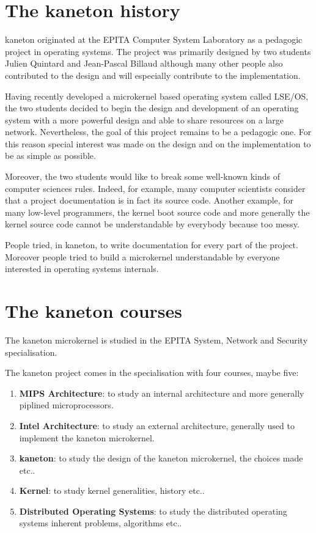 \begin{multicols}{2}

%
%

\section{The kaneton history}

kaneton originated at the EPITA Computer System Laboratory as a pedagogic
project in operating systems. The project was primarily designed by two
students Julien Quintard and Jean-Pascal Billaud although many other people
also contributed to the design and will especially contribute to the
implementation.

Having recently developed a microkernel based operating system called LSE/OS,
the two students decided to begin the design and development of an operating
system with a more powerful design and able to share resources on a large
network. Nevertheless, the goal of this project remains to be a pedagogic
one. For this reason special interest was made on the design and on the
implementation to be as simple as possible.

Moreover, the two students would like to break some well-known kinds of
computer sciences rules. Indeed, for example, many computer scientists
consider that a project documentation is in fact its source code.
Another example, for many low-level programmers, the kernel boot source code
and more generally the kernel source code cannot be understandable by
everybody because too messy.

People tried, in kaneton, to write documentation for every part of the project.
Moreover people tried to build a microkernel understandable by everyone
interested in operating systems internals.

%
%

\section{The kaneton courses}

The kaneton microkernel is studied in the EPITA System, Network and Security
specialisation.

The kaneton project comes in the specialisation with four courses, maybe
five:

\begin{enumerate}
  \item
    \textbf{MIPS Architecture}: to study an internal architecture and
    more generally piplined microprocessors.
  \item
    \textbf{Intel Architecture}: to study an external architecture, generally
    used to implement the kaneton microkernel.
  \item
    \textbf{kaneton}: to study the design of the kaneton microkernel, the
    choices made etc..
  \item
    \textbf{Kernel}: to study kernel generalities, history etc..
  \item
    \textbf{Distributed Operating Systems}: to study the distributed
    operating systems inherent problems, algorithms etc..
\end{enumerate}


\end{multicols}
